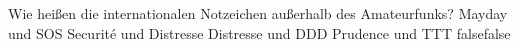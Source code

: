     {Wie heißen die internationalen Notzeichen außerhalb des Amateurfunks?}
    {Mayday und SOS}
    {Securité und Distresse}
    {Distresse und DDD}
    {Prudence und TTT}
    {false}{false}